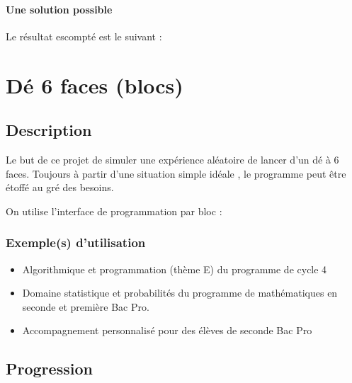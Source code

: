 \documentclass[letterpaper,10pt,french]{sphinxmanual}
\begin{document}
\paragraph{Une solution possible}
\label{\detokenize{decouverte/pileface-bloc3:une-solution-possible}}
Le résultat escompté est le suivant :

\noindent{}


\section{Dé 6 faces (blocs)}
\label{\detokenize{decouverte/de6faces-bloc:blocde6faces}}\label{\detokenize{decouverte/de6faces-bloc::doc}}\label{\detokenize{decouverte/de6faces-bloc:de-6-faces-blocs}}

\subsection{Description}
\label{\detokenize{decouverte/de6faces-bloc:description}}
Le but de ce projet de simuler une expérience aléatoire de lancer d’un dé à 6 faces.
Toujours à partir d’une situation simple idéale , le programme peut être étoffé au gré des besoins.

On utilise l’interface de programmation par bloc :



\subsubsection{Exemple(s) d’utilisation}
\label{\detokenize{decouverte/de6faces-bloc:exemple-s-d-utilisation}}\begin{itemize}
\item {} 
Algorithmique et programmation (thème E) du programme de cycle 4

\item {} 
Domaine statistique et probabilités du programme de mathématiques en seconde et première Bac Pro.

\item {} 
Accompagnement personnalisé pour des élèves de seconde Bac Pro

\end{itemize}


\subsection{Progression}
\label{\detokenize{decouverte/de6faces-bloc:progression}}
\end{document}
